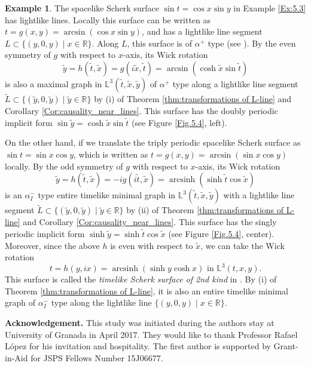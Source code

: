 \documentclass[12pt,amstex]{amsart}%
\theoremstyle{plain} %
\theoremstyle{definition}
\newtheorem{example}[theorem]{Example}
\DeclareMathOperator{\arcsinh}{arcsinh}
\begin{document}
\begin{example}\label{Ex:5.4}The spacelike Scherk surface $\sin{t}=\cos{x}\sin{y}$ in Example \ref{Ex:5.3} has lightlike lines. Locally this surface can be written as $t=g(x,y)=\arcsin{(\cos{x}\sin{y})}$, and has a lightlike line segment $L\subset \{(y,0,y)\mid x\in \mathbb{R}\}$. Along $L$, this surface is of $\alpha^+$ type (see \cite[Example 3]{FujimoriETAL1}). By the even symmetry of $g$ with respect to $x$-axis, its Wick rotation
\[ 
\tilde{y}=h(\tilde{t},\tilde{x})=g(i\tilde{x},\tilde{t})=\arcsin{(\cosh{\tilde{x}}\sin{\tilde{t}})}
\]
is also a maximal graph in $\mathbb{L}^3(\tilde{t},\tilde{x},\tilde{y})$ of $\alpha^+$ type along a lightlike line segment $\tilde{L} \subset \{(\tilde{y},0,\tilde{y})\mid \tilde{y}\in \mathbb{R}\}$ by (i) of Theorem \ref{thm:transformations of L-line} and Corollary \ref{Cor:causality_near_lines}. This surface has the doubly periodic implicit form $\sin{\tilde{y}}=\cosh{\tilde{x}}\sin{\tilde{t}}$ (see Figure \ref{Fig.5.4}, left). 

On the other hand, if we translate the triply periodic spacelike Scherk surface as $\sin{t}=\sin{x}\cos{y}$, which is written as $t=g(x,y)=\arcsin{(\sin{x}\cos{y})}$ locally. By the odd symmetry of $g$ with respect to $x$-axis, its Wick rotation
\[ 
\tilde{y}=h(\tilde{t},\tilde{x})=-ig(i\tilde{t},\tilde{x})=\arcsinh{(\sinh{\tilde{t}}\cos{\tilde{x}})}
\]
is an $\alpha^-_{I}$ type entire timelike minimal graph in $\mathbb{L}^3(\tilde{t},\tilde{x},\tilde{y})$ with a lightlike line segment $\tilde{L} \subset \{(\tilde{y},0,\tilde{y})\mid \tilde{y}\in \mathbb{R}\}$ by (ii) of Theorem \ref{thm:transformations of L-line} and Corollary \ref{Cor:causality_near_lines}. This surface has the singly periodic implicit form $\sinh{\tilde{y}}=\sinh{\tilde{t}}\cos{\tilde{x}}$ (see Figure \ref{Fig.5.4}, center). Moreover, since the above $h$ is even with respect to $\tilde{x}$, we can take the Wick rotation
\[
t=h(y,ix)=\arcsinh{(\sinh{y}\cosh{x})} \text{ in $\mathbb{L}^3(t,x,y)$}.
\]
This surface is called the {\it timelike Scherk surface of 2nd kind} in \cite[Example 5]{FujimoriETAL1}. By (i) of Theorem \ref{thm:transformations of L-line}, it is also an entire timelike minimal graph of $\alpha^-_{I}$ type along the lightlike line $\{(y,0,y)\mid x\in \mathbb{R}\}$.

\noindent
\textbf{Acknowledgement.} 
This study was initiated during the authors stay at University of Granada in April 2017. They would like to thank Professor Rafael L\'{o}pez for his invitation and hospitality. The first author is supported by Grant-in-Aid for JSPS Fellows Number 15J06677.


\end{example}
\end{document}
